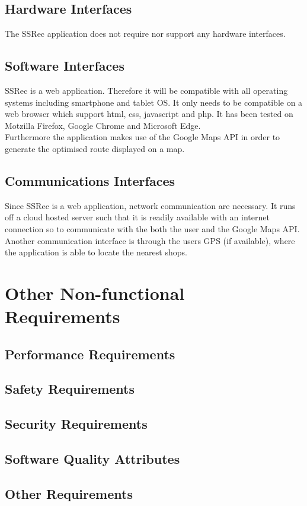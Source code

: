 \documentclass[10pt, a4paper, onecolumn]{scrartcl}
\begin{document}
		\subsection{Hardware Interfaces}
		
		The SSRec application does not require nor support any hardware interfaces.
		
		\subsection{Software Interfaces}
		
		SSRec is a web application. Therefore it will be compatible with all operating systems including smartphone and tablet OS. It only needs to be compatible on a web browser which support html, css, javascript and php. It has been tested on Motzilla Firefox, Google Chrome and Microsoft Edge.\\
		
		Furthermore the application makes use of the Google Maps API in order to generate the optimised route displayed on a map.
		
		\subsection{Communications Interfaces}
		
		Since SSRec is a web application, network communication are necessary. It runs off a cloud hosted server such that it is readily available with an internet connection so to communicate with the both the user and the Google Maps API. Another communication interface is through the users GPS (if available), where the application is able to locate the nearest shops.
	
	\section{Other Non-functional Requirements}
	
		\subsection{Performance Requirements}
		
		\subsection{Safety Requirements}
		
		\subsection{Security Requirements}
		
		\subsection{Software Quality Attributes}
		
		\subsection{Other Requirements}
	

	
	
	
	
	
\end{document}
